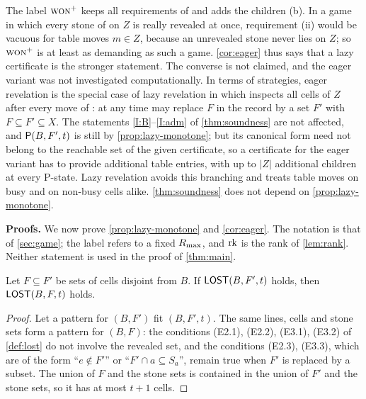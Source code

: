 \begin{remark}\label{rem:eager}
The label $\textup{\textsc{won}}^{+}$ keeps all requirements of \WON{} and adds the children \textup{(b)}. In a game in which
every stone of \Maker{} on $Z$ is really revealed at once, requirement \textup{(ii)} would be vacuous for table
moves $m\in Z$, because an unrevealed stone never lies on $Z$; so $\textup{\textsc{won}}^{+}$ is at least as demanding as such a
game. \cref{cor:eager} thus says that a lazy certificate is the stronger statement. The converse is
not claimed, and the eager variant was not investigated computationally. In terms of strategies, eager
revelation is the special case of lazy revelation in which \Breaker{} inspects all cells of $Z$ after every
move of \Maker: at any time \Breaker{} may replace $F$ in the record by a set $F'$ with
$F\subseteq F'\subseteq X$. The statements \ref{I:B}--\ref{I:adm} of \cref{thm:soundness} are not
affected, and $\mathsf{P}(B,F',t)$ is still \WON{} by \cref{prop:lazy-monotone}; but its canonical form
need not belong to the reachable set of the given certificate, so a certificate for the eager variant has to
provide additional table entries, with up to $|Z|$ additional children at every P-state. Lazy revelation
avoids this branching and treats table moves on busy and on non-busy cells alike.
\cref{thm:soundness} does not depend on \cref{prop:lazy-monotone}.
\end{remark}

\medskip\noindent\textbf{Proofs.}
We now prove \cref{prop:lazy-monotone} and
\cref{cor:eager}. The notation is that of \cref{sec:game}; the label \WON{} refers to a fixed
$R_{\max}$, and $\operatorname{rk}$ is the rank of \cref{lem:rank}. Neither statement is used in the proof of
\cref{thm:main}.

\begin{lemma}\label{lem:lost-antitone}
Let $F\subseteq F'$ be sets of cells disjoint from $B$. If $\mathsf{LOST}(B,F',t)$ holds, then $\mathsf{LOST}(B,F,t)$ holds.
\end{lemma}

\begin{proof}
Let a pattern for $(B,F')$ fit $(B,F',t)$. The same lines, cells and stone sets form a pattern for $(B,F)$:
the conditions (E2.1), (E2.2), (E3.1), (E3.2) of \cref{def:lost} do not involve the revealed set,
and the conditions (E2.3), (E3.3), which are of the form ``$e\notin F'$'' or ``$F'\cap a\subseteq S_a$'', remain
true when $F'$ is replaced by a subset. The union of $F$ and the stone sets is contained in the union of
$F'$ and the stone sets, so it has at most $t+1$ cells.
\end{proof}

